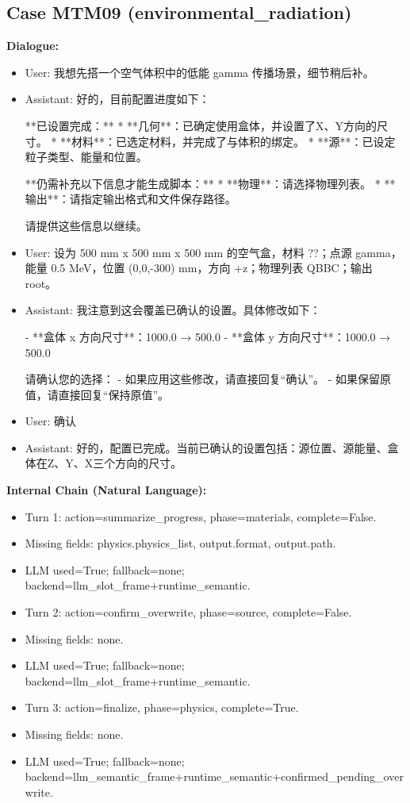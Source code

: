 \documentclass[11pt]{ctexart}
\begin{document}
\subsection{Case MTM09 (environmental\_radiation)}
\textbf{Dialogue:}
\begin{itemize}
\item User: 我想先搭一个空气体积中的低能 gamma 传播场景，细节稍后补。
\item Assistant: 好的，目前配置进度如下：

**已设置完成：**
*   **几何**：已确定使用盒体，并设置了X、Y方向的尺寸。
*   **材料**：已选定材料，并完成了与体积的绑定。
*   **源**：已设定粒子类型、能量和位置。

**仍需补充以下信息才能生成脚本：**
*   **物理**：请选择物理列表。
*   **输出**：请指定输出格式和文件保存路径。

请提供这些信息以继续。
\item User: 设为 500 mm x 500 mm x 500 mm 的空气盒，材料 ??；点源 gamma，能量 0.5 MeV，位置 (0,0,-300) mm，方向 +z；物理列表 QBBC；输出 root。
\item Assistant: 我注意到这会覆盖已确认的设置。具体修改如下：

- **盒体 x 方向尺寸**：1000.0 → 500.0
- **盒体 y 方向尺寸**：1000.0 → 500.0

请确认您的选择：
- 如果应用这些修改，请直接回复“确认”。
- 如果保留原值，请直接回复“保持原值”。
\item User: 确认
\item Assistant: 好的，配置已完成。当前已确认的设置包括：源位置、源能量、盒体在Z、Y、X三个方向的尺寸。
\end{itemize}
\textbf{Internal Chain (Natural Language):}
\begin{itemize}
\item Turn 1: action=summarize\_progress, phase=materials, complete=False.
\item Missing fields: physics.physics\_list, output.format, output.path.
\item LLM used=True; fallback=none; backend=llm\_slot\_frame+runtime\_semantic.
\item Turn 2: action=confirm\_overwrite, phase=source, complete=False.
\item Missing fields: none.
\item LLM used=True; fallback=none; backend=llm\_slot\_frame+runtime\_semantic.
\item Turn 3: action=finalize, phase=physics, complete=True.
\item Missing fields: none.
\item LLM used=True; fallback=none; backend=llm\_semantic\_frame+runtime\_semantic+confirmed\_pending\_overwrite.
\end{itemize}
\end{document}
